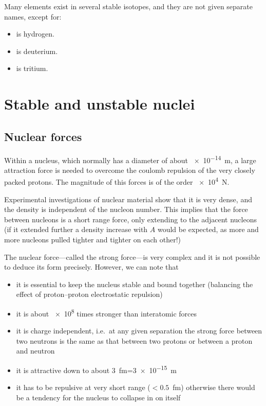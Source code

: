 \documentclass[a4paper,12pt]{article}
\begin{document}
Many elements exist in several stable isotopes, and they are not given separate names, except for:
\begin{itemize}
\item {} is hydrogen.
\item {} is deuterium.
\item {} is tritium.
\end{itemize}

\section{Stable and unstable nuclei}

\subsection{Nuclear forces}

Within a nucleus, which normally has a diameter of about \SI{e-14}{m}, a large attraction force is needed to overcome the coulomb repulsion of the very closely packed protons.  The magnitude of this forces is of the order \SI{e4}{N}.

Experimental investigations of nuclear material show that it is very dense, and the density is independent of the nucleon number.  This implies that the force between nucleons is a short range force, only extending to the adjacent nucleons (if it extended further a density increase with $A$ would be expected, as more and more nucleons pulled tighter and tighter on each other!)

The nuclear force---called the strong force---is very complex and it is not possible to deduce its form precisely.  However, we can note that
\begin{itemize}
\item it is essential to keep the nucleus stable and bound together (balancing the effect of proton--proton electrostatic repulsion)
\item it is about \num{e8} times stronger than interatomic forces
\item it is charge independent, i.e.\  at any given separation the strong force between two neutrons is the same as that between two protons or between a proton and neutron
\item it is attractive down to about \SI{3}{fm}=\SI{3e-15}{m}
\item it has to be repulsive at very short range ($<0.5$~fm) otherwise there would be a tendency for the nucleus to collapse in on itself
\end{itemize}
\end{document}
